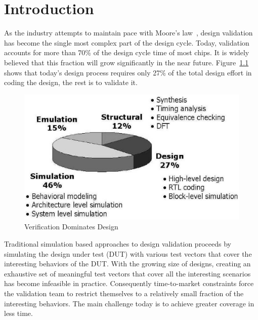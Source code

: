 \chapter{Introduction} \label{chap1}
\noindent
As the industry attempts to maintain pace with Moore's law~\cite{moore},
design validation has become the single most complex part of the design cycle.
Today, validation accounts for more than 70\% of the design cycle time of most
chips. It is widely believed that this fraction will grow significantly in the
near future. Figure~\ref{fig1.1} shows that today's design process 
requires only 27\% of the total design effort in coding the design, the rest is 
to validate it.

\begin{figure}[htb]
\centering
\includegraphics[scale = 0.45]{../intro/verify.eps}
\caption{Verification Dominates Design~\cite{mentor}} \label{fig1.1}
\end{figure}

\noindent
Traditional simulation based approaches to design validation proceeds by
simulating the design under test (DUT) with various test vectors that cover the
interesting behaviors of the DUT. With the growing size of designs, creating an
exhaustive set of meaningful test vectors that cover all the interesting
scenarios   has become infeasible in practice. Consequently time-to-market
constraints force the validation team to restrict themselves to a relatively
small fraction of the interesting behaviors. The main challenge today is to
achieve greater coverage in less time. 

